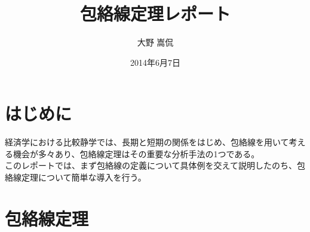 \documentclass[11pt,a4j,fleqn]{jarticle}
\title{包絡線定理レポート}
\author{大野 嵩侃}
\date{2014年6月7日}
\begin{document}
\maketitle

\section{はじめに}
経済学における比較静学では、長期と短期の関係をはじめ、包絡線を用いて考える機会が多々あり、包絡線定理はその重要な分析手法の1つである。\\
このレポートでは、まず包絡線の定義について具体例を交えて説明したのち、包絡線定理について簡単な導入を行う。
\section{包絡線定理}
\end{document}
